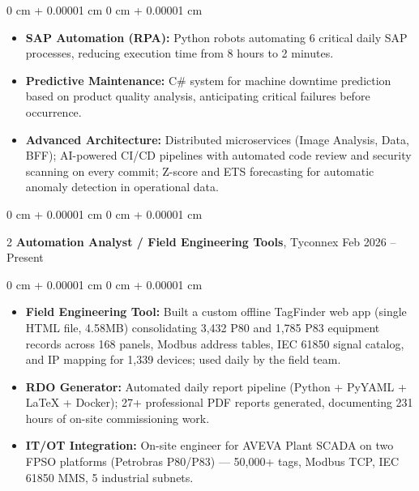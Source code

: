 \documentclass[10pt, letterpaper]{article}
\newenvironment{highlights}{ \begin{itemize}[ topsep=0.10 cm, parsep=0.10 cm, partopsep=0pt,
itemsep=0pt, leftmargin=0 cm + 10pt ] }{ \end{itemize} }
\newenvironment{onecolentry}{ \begin{adjustwidth}{ 0 cm + 0.00001 cm }{ 0 cm + 0.00001 cm }
}{ \end{adjustwidth} }
\newenvironment{twocolentry}[2][]{ \onecolentry \def\secondColumn{#2} \setcolumnwidth{\fill, 4.5 cm}
\begin{paracol}{2} }{ \switchcolumn \raggedleft \secondColumn \end{paracol}
\endonecolentry }
\begin{document}
	\vspace{0.10 cm}
	\begin{onecolentry}
		\begin{highlights}
			\item \textbf{SAP Automation (RPA):} Python robots automating 6 critical daily SAP processes, reducing execution time from 8 hours to 2 minutes.
			\item \textbf{Predictive Maintenance:} C\# system for machine downtime prediction based on product quality analysis, anticipating critical failures before occurrence.
			\item \textbf{Advanced Architecture:} Distributed microservices (Image Analysis, Data, BFF); AI-powered CI/CD pipelines with automated code review and security scanning on every commit; Z-score and ETS forecasting for automatic anomaly detection in operational data.
		\end{highlights}
	\end{onecolentry}

	\vspace{0.2 cm}

	\begin{twocolentry}
		{ Feb 2026 -- Present } \textbf{Automation Analyst / Field Engineering Tools}, Tyconnex
	\end{twocolentry}

	\vspace{0.10 cm}
	\begin{onecolentry}
		\begin{highlights}
			\item \textbf{Field Engineering Tool:} Built a custom offline TagFinder web app (single HTML file, 4.58MB) consolidating 3,432 P80 and 1,785 P83 equipment records across 168 panels, Modbus address tables, IEC 61850 signal catalog, and IP mapping for 1,339 devices; used daily by the field team.
			\item \textbf{RDO Generator:} Automated daily report pipeline (Python + PyYAML + LaTeX + Docker); 27+ professional PDF reports generated, documenting 231 hours of on-site commissioning work.
			\item \textbf{IT/OT Integration:} On-site engineer for AVEVA Plant SCADA on two FPSO platforms (Petrobras P80/P83) --- 50,000+ tags, Modbus TCP, IEC 61850 MMS, 5 industrial subnets.
		\end{highlights}
	\end{onecolentry}

	\vspace{0.2 cm}
\end{document}
